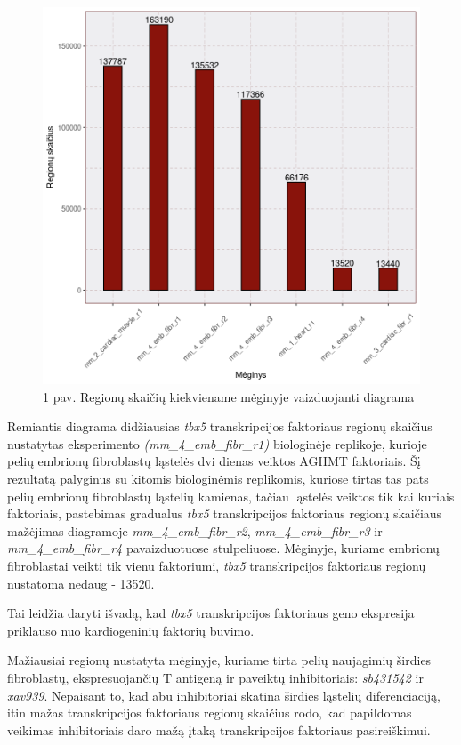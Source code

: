 \documentclass[12pt]{article}
\begin{document}
\begin{figure}[htb]
    \begin{center}
        \includegraphics[width=0.7\linewidth]{Figures/total_peak_counts.png}
        \caption*{1 pav. Regionų skaičių kiekviename mėginyje vaizduojanti diagrama}
    \end{center}
\end{figure}

Remiantis diagrama didžiausias \emph{tbx5} transkripcijos faktoriaus
regionų skaičius nustatytas eksperimento \emph{(mm\_4\_emb\_fibr\_r1)}
biologinėje replikoje, kurioje pelių embrionų fibroblastų ląstelės
dvi dienas veiktos AGHMT faktoriais.
Šį rezultatą palyginus su kitomis biologinėmis replikomis, kuriose
tirtas tas pats pelių embrionų fibroblastų ląstelių kamienas, tačiau
ląstelės veiktos tik kai kuriais faktoriais, pastebimas gradualus
\emph{tbx5} transkripcijos faktoriaus regionų skaičiaus mažėjimas
diagramoje \emph{mm\_4\_emb\_fibr\_r2}, \emph{mm\_4\_emb\_fibr\_r3} ir
\emph{mm\_4\_emb\_fibr\_r4} pavaizduotuose stulpeliuose. Mėginyje,
kuriame embrionų fibroblastai veikti tik vienu faktoriumi,
\emph{tbx5} transkripcijos faktoriaus regionų nustatoma nedaug -
13520.

Tai leidžia daryti išvadą, kad \emph{tbx5} transkripcijos faktoriaus
geno ekspresija priklauso nuo kardiogeninių faktorių buvimo.

Mažiausiai regionų nustatyta mėginyje, kuriame tirta pelių
naujagimių širdies fibroblastų, ekspresuojančių T antigeną
ir paveiktų inhibitoriais: \emph{sb431542} ir \emph{xav939}.
Nepaisant to, kad abu inhibitoriai skatina širdies ląstelių
diferenciaciją, itin mažas transkripcijos faktoriaus regionų
skaičius rodo, kad papildomas veikimas inhibitoriais daro
mažą įtaką transkripcijos faktoriaus pasireiškimui.
\end{document}
